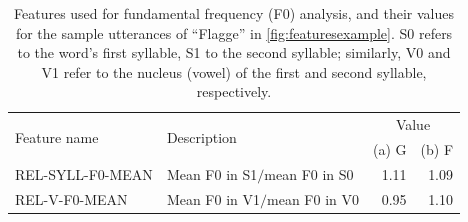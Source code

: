 %		
		
		\begin{table}%
		
		\caption[Features used for fundamental frequency (F0) analysis%
		]{%
		Features used for fundamental frequency (F0) analysis, and their values for the sample utterances of ``Flagge'' in \cref{fig:featuresexample}. 
		S0 refers to the word's first syllable, S1 to the second syllable; similarly, V0 and V1 refer to the nucleus (vowel) of the first and second syllable, respectively.
		}
		{\renewcommand{\arraystretch}{1.25}%
		\begin{tabularx}{\textwidth}%
			{lXrr}
		\toprule
		\multirow{2}{*}{Feature name} 
									& \multirow{2}{*}{Description}
													& \multicolumn{2}{c}{Value} \\						
					  				&							&  (a) G		& (b) F
					  																																\\
		\midrule
		REL-SYLL-F0-MEAN 
			& Mean F0 in S1$/$mean F0 in S0
			& 1.11    & 1.09 \\
			
		REL-V-F0-MEAN 
			& Mean F0 in V1$/$mean F0 in V0
			&  0.95		& 1.10 \\
		

\end{tabularx}}
\end{table}
